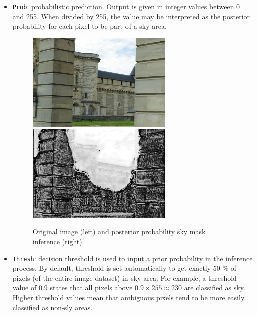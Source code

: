 \begin{itemize}
	\item \texttt{Prob}: probabilistic prediction. Output is given in integer values between 0 and 255. When divided by 255, the value may be interpreted as the posterior probability for each pixel to be part of a sky area. \newline
	
	\begin{figure}[!h]
		\begin{center}
			\includegraphics[width=70mm]{FIGS/SkyMask/im3.JPG}
			\hspace{0.2cm}
			\includegraphics[width=70mm]{FIGS/SkyMask/mask3.JPG}
			\caption{Original image (left) and posterior probability sky mask inference (right).}
		\end{center}	
	\end{figure}
	
	\item \texttt{Thresh}: decision threshold is used to input a prior probability in the inference process. By default, threshold is set automatically to get exactly 50 \% of pixels (of the entire image dataset) in sky area. For example, a threshold value of 0.9 states that all pixels above $0.9 \times 255 \approx 230$ are classified as sky. Higher threshold values mean that ambiguous pixels tend to be more easily classified as non-sly areas. \newline
	

\end{itemize}
